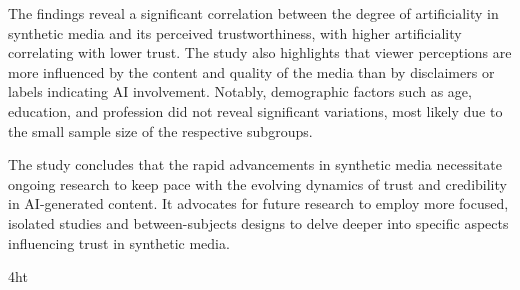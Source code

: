 \documentclass[
  a4paper,  %
  twoside,  %
  bibliography=totoc,
  headsepline,
  cleardoublepage=empty,
  parskip=half,
  draft=false
]{scrbook}
\begin{document}
The findings reveal a significant correlation between the degree of artificiality in synthetic media and its perceived trustworthiness, with higher artificiality correlating with lower trust. The study also highlights that viewer perceptions are more influenced by the content and quality of the media than by disclaimers or labels indicating AI involvement. Notably, demographic factors such as age, education, and profession did not reveal significant variations, most likely due to the small sample size of the respective subgroups.

The study concludes that the rapid advancements in synthetic media necessitate ongoing research to keep pace with the evolving dynamics of trust and credibility in AI-generated content. It advocates for future research to employ more focused, isolated studies and between-subjects designs to delve deeper into specific aspects influencing trust in synthetic media.


\cleardoublepage



\iftex4ht
\else
\fi

%
%

%
%
%
\tableofcontents


\listoffigures
\listoftables


\let\iflistings\iffalse
\iflistings
  \ifdeutsch
  \else
  \fi
\fi

\let\ifalgorithms\iffalse
\ifalgorithms
  \ifdeutsch
  \else
  \fi
\fi
\end{document}
